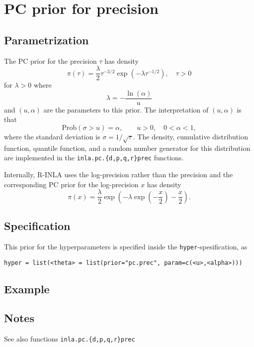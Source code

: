 \documentclass[a4paper,11pt]{article}
\begin{document}
\section*{PC prior for precision}

\subsection*{Parametrization}
The PC prior for the precision $\tau$ has density $$
\pi(\tau) = \frac{\lambda}{2}\tau^{-3/2} \exp\left(-\lambda \tau^{-1/2}\right), \quad \tau >0
$$
for $\lambda>0$ where
\begin{displaymath}
    \lambda = -\frac{\ln(\alpha)}{u}
\end{displaymath}
and $(u, \alpha{})$ are the parameters to this prior. The
interpretation of $(u,\alpha)$ is that
\begin{displaymath}
    \text{Prob}(\sigma > u) = \alpha, \qquad u>0, \quad 0<\alpha<1,
\end{displaymath}
where the standard deviation is $\sigma = 1/\sqrt{\tau}$.  The density, cumulative distribution function, quantile function, and a random number generator for this distribution are implemented in the  \texttt{inla.pc.\{d,p,q,r\}prec} functions.


Internally, R-INLA uses the log-precision rather than the precision and the corresponding  PC prior for the log-precision $x$ has density 
\begin{equation}
    \pi(x) = \frac{\lambda}{2} \exp\left(
      -\lambda\exp\left(-\frac{x}{2}\right) - \frac{x}{2}
    \right).
\end{equation}

\subsection*{Specification}
This prior for the hyperparameters is specified inside the
\texttt{hyper}-spesification, as
\begin{center}
    \texttt{hyper = list(<theta> =
        list(prior="pc.prec", param=c(<u>,<alpha>)))}
\end{center}

\subsection*{Example}

\subsection*{Notes}

See also functions \texttt{inla.pc.\{d,p,q,r\}prec}
\end{document}
